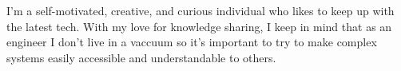 \documentclass[10pt]{developercv} %
\begin{document}
\vspace{0.5cm}


\begin{minipage}[t]{0.45\textwidth} %
	\vspace{-\baselineskip} %

	I'm a self-motivated, creative, and curious individual who likes to keep up with the latest
	tech. With my love for knowledge sharing, I keep in mind that as an engineer I don't live in a vaccuum
	so it's important to try to make complex systems easily accessible and understandable to others. \\
\end{minipage}
\hfill  %
\begin{minipage}[t]{0.45\textwidth} %
	\vspace{-\baselineskip} %
	\begin{barchart}{5.5}
	\end{barchart}
\end{minipage}


\end{document}
